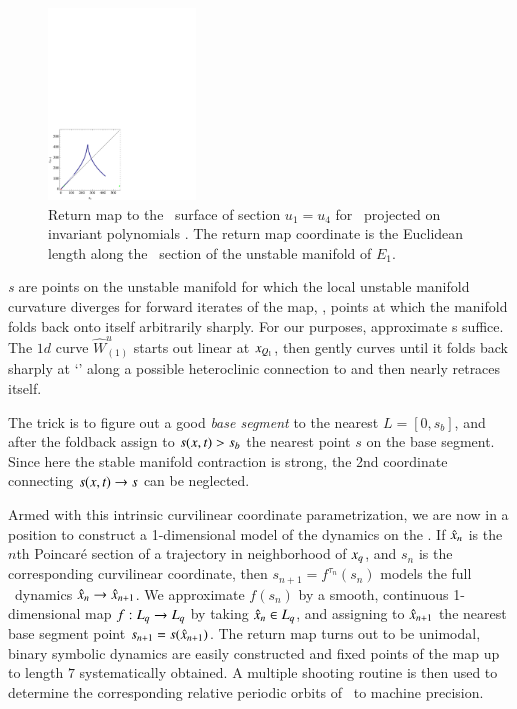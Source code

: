 \begin{figure}[ht]
\begin{center}
\includegraphics[width=0.35\textwidth]{../figs/CLEipRM}
\end{center}
\caption{
Return map to the \Poincare\ surface of section $u_1=u_4$ for
\cLe\ projected on invariant polynomials .
The return map coordinate is the Euclidean length along the
\Poincare\ section of the unstable manifold of $E_1$.
    }
\label{fig:CLEipRM}
\end{figure}

{\em \Turn s} are points on the unstable
manifold for which the local unstable manifold curvature diverges
for forward iterates of the map, \ie, points at which the manifold
folds back onto itself arbitrarily sharply.
For our purposes,
approximate \turn s suffice.
The $1d$ curve $\hat{W}^u_{(1)}$ starts out linear at
$x_{Q_{1}}$, then gently curves until it folds back sharply
at `\turn' along a possible heteroclinic connection to 
and then nearly retraces itself.

The trick is to figure out a good {\em base segment} to the
nearest {\turn} $L=[0,s_{b}]$, and after the foldback assign
to $s(x,t)>s_{b}$ the nearest point $s$ on the base
segment. Since here the stable manifold contraction is strong, the
2nd coordinate connecting $s(x,t) \to s$ can be neglected.

Armed with this intrinsic curvilinear coordinate
parametrization, we are now in a position to construct a
1-dimensional model of the dynamics on the \nws. If
$\hat{x}_n$ is the $n$th Poincar\'e section of a
trajectory in neighborhood of $x_q$, and $s_n$ is the
corresponding curvilinear coordinate, then $s_{n+1} = f^{\tau_n}(s_n)$
models the full \statesp\ dynamics $\hat{x}_n \to
\hat{x}_{n+1}$. We approximate $f(s_n)$ by a smooth,
continuous 1-dimensional map $f : L_q \to L_q$ by taking
$\hat{x}_n \in L_q$, and assigning to
$\hat{x}_{n+1}$ the nearest base segment point
$s_{n+1}=s(\hat{x}_{n+1})$. The return map turns out to
be unimodal, binary symbolic dynamics are easily constructed
and fixed points of the map up to length
$7$ systematically obtained. A multiple shooting routine is then
used to determine the corresponding relative periodic orbits of
\cLe\ to machine precision.
